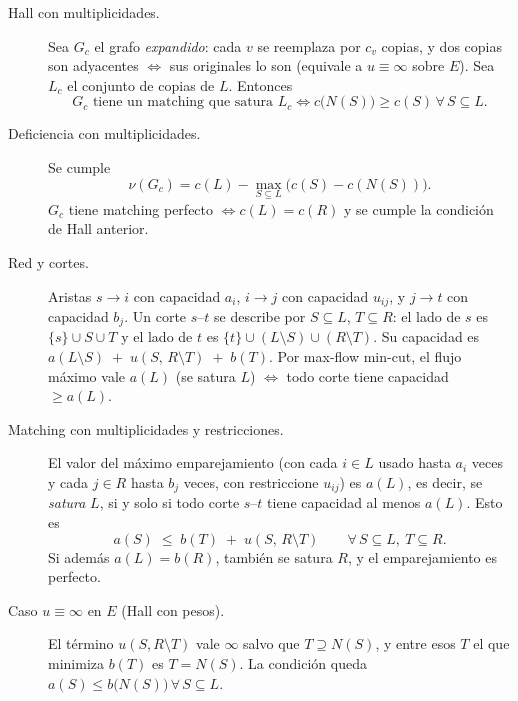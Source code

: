 \begin{description}
\item[Hall con multiplicidades.]
  Sea $G_c$ el grafo \emph{expandido}: cada $v$ se reemplaza por $c_v$ copias, y dos copias son
  adyacentes $\iff$ sus originales lo son (equivale a $u\equiv\infty$ sobre $E$).
  Sea $L_c$ el conjunto de copias de $L$. Entonces
  \[
    G_c \text{ tiene un matching que satura } L_c
    \iff c\bigl(N(S)\bigr)\ge c(S)\,\forall\, S\subseteq L .
  \]
\item[Deficiencia con multiplicidades.] Se cumple
  \[
    \nu(G_c)=c(L)-\max_{S\subseteq L}\bigl(c(S)-c(N(S))\bigr).
  \]
  $G_c$ tiene matching perfecto $\iff c(L)=c(R)$ y se cumple la condici\'on de Hall anterior.
  
  \item[Red y cortes.]
  Aristas $s\to i$ con capacidad $a_i$, $i\to j$ con capacidad $u_{ij}$, y $j\to t$ con capacidad $b_j$.
  Un corte $s$--$t$ se describe por $S\subseteq L$, $T\subseteq R$:
  el lado de $s$ es $\{s\}\cup S\cup T$ y el lado de $t$ es $\{t\}\cup(L\setminus S)\cup(R\setminus T)$.
  Su capacidad es
  $
    a(L\setminus S)\;+\;u(S,\,R\setminus T)\;+\;b(T).
  $
  Por max-flow min-cut, el flujo m\'aximo vale $a(L)$ (se satura $L$) $\iff$ todo corte tiene
  capacidad $\ge a(L)$.
  
  
  \item[Matching con multiplicidades y restricciones.]
  El valor del m\'aximo emparejamiento (con cada $i\in L$ usado hasta $a_i$ veces
  y cada $j\in R$ hasta $b_j$ veces, con restriccione $u_{ij}$) es $a(L)$, es decir, se \emph{satura} $L$, si y solo si
  todo corte $s$--$t$ tiene capacidad al menos $a(L)$. Esto es
  \[
    a(S)\;\le\; b(T)\;+\;u(S,\,R\setminus T)\qquad\forall\, S\subseteq L,\ T\subseteq R .
  \]
  Si adem\'as $a(L)=b(R)$, tambi\'en se satura $R$, y el emparejamiento es perfecto.


\item[Caso $u\equiv\infty$ en $E$ (Hall con pesos).]
  El t\'ermino $u(S,R\setminus T)$ vale $\infty$ salvo que $T\supseteq N(S)$, y entre esos $T$ el
  que minimiza $b(T)$ es $T=N(S)$. La condici\'on queda
  $
    a(S)\le b\bigl(N(S)\bigr)\,\forall\, S\subseteq L .
  $


\end{description}
